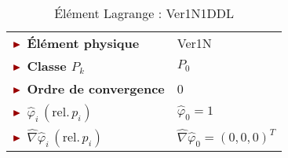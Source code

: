 \begin{table}[H]
\begin{minipage}[t]{0.48\linewidth}
\begin{tabular}{>{\bfseries} l|l}
			\midrule
			$\mytriangle$ Élément physique & \textcolor{MyRed}{Ver1N}\\
			$\mytriangle$ Classe $P_k$ & $P_0$\\
			$\mytriangle$ Ordre de convergence & 0\\
			\midrule
			$\mytriangle$ $\widehat{\varphi}_i\, (\text{rel.}\, p_i)$ &  $\widehat{\varphi}_0 = 1$\\
			\midrule
			$\mytriangle$ $\widehat{\nabla}\widehat{\varphi}_i\, (\text{rel.}\, p_i)$ & $\widehat{\nabla}\widehat{\varphi}_0 = \left(0, 0, 0\right)^T$ \\
			\bottomrule %
		\end{tabular}
		\caption{Élément Lagrange : Ver1N1DDL}
		\label{tab:Ver1N1DDL}
	\end{minipage}\hfill
\end{table}

